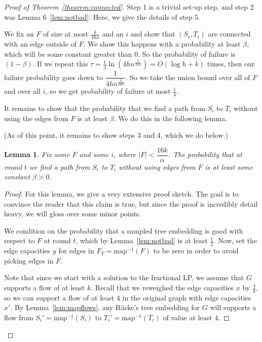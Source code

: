 \documentclass[12pt]{article}
\newtheorem{lemma}{Lemma}
\begin{document}
\begin{proof}[Proof of Theorem~\ref{theorem:connected}]

Step 1 is a trivial set-up step, and step 2 was Lemma 6~\ref{lem:notbad}. Here, we give the details of step 5.

We fix an $F$ of size at most $\frac{k}{16\alpha}$ and an $i$ and show that $(S_i, T_i)$ are connected with an edge outside of $F$. We show this happens with a probability at least $\beta$, which will be some constant greater than 0. So the probability of failure is $(1-\beta)$. If we repeat this $\tau = \frac{1}{\beta}\ln(4hn^{\frac{k}{16\alpha}}) = O(\log h + k)$ times, then our failure probability goes down to $\dfrac{1}{4hn^{\frac{k}{16\alpha}}}$. So we take the union bound over all of $F$ and over all $i$, so we get probability of failure at most $\frac{1}{4}$.

It remains to show that the probability that we find a path from $S_i$ to $T_i$ without using the edges from $F$ is at least $\beta$. We do this in the following lemma.

(As of this point, it remains to show steps 3 and 4, which we do below.)

\begin{lemma}
Fix some $F$ and some $i$, where $|F| < \dfrac{16k}{\alpha}$. The probability that at round $t$ we find a path from $S_i$ to $T_i$ without using edges from $F$ is at least some constant $\beta > 0$. 
\end{lemma}

\begin{proof}

For this lemma, we give a very extensive proof sketch. The goal is to convince the reader that this claim is true, but since the proof is incredibly detail heavy, we will gloss over some minor points.

We condition on the probability that a sampled tree embedding is good with respect to $F$ at round $t$, which by Lemma~\ref{lem:notbad} is at least $\frac{1}{2}$. Now, set the edge capacities $y$ for edges in $F_T = \text{map}^{-1}(F)$ to be zero in order to avoid picking edges in $F$. 

Note that since we start with a solution to the fractional LP, we assume that $G$ supports a flow of at least $k$. Recall that we reweighed the edge capacities $x$ by $\frac{4}{k}$, so we can support a flow of at least $4$ in the original graph with edge capacities $x'$. By Lemma~\ref{lem:mapflows}, any R\"{a}cke's tree embedding for $G$ will supports a flow from $S_i' = \text{map}^{-1}(S_i)$ to $T_i' = \text{map}^{-1}(T_i)$ of value at least $4$. 


\end{proof}
\end{proof}
\end{document}
